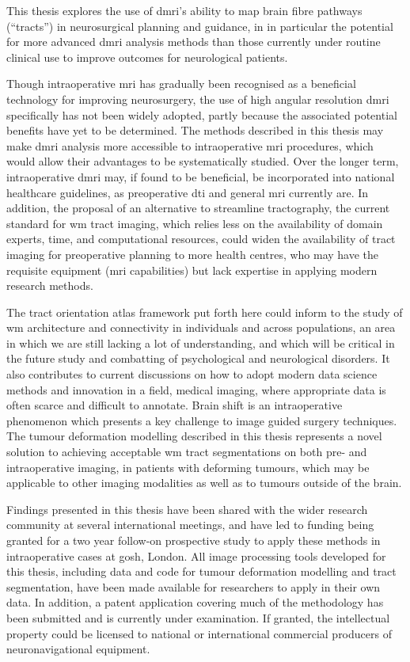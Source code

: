 \begin{impactstatement}

This thesis explores the use of \gls{dmri}'s ability to map brain fibre pathways (``tracts'') in neurosurgical planning and guidance, in in particular the potential for more advanced \gls{dmri} analysis methods than those currently under routine clinical use to improve outcomes for neurological patients.

Though intraoperative \gls{mri} has gradually been recognised as a beneficial technology for improving neurosurgery, the use of high angular resolution \gls{dmri} specifically has not been widely adopted, partly because the associated potential benefits have yet to be determined.
The methods described in this thesis may make \gls{dmri} analysis more accessible to intraoperative \gls{mri} procedures, which would allow their advantages to be systematically studied.
Over the longer term, intraoperative \gls{dmri} may, if found to be beneficial, be incorporated into national healthcare guidelines, as preoperative \gls{dti} and general \gls{mri} currently are.
In addition, the proposal of an alternative to streamline tractography, the current standard for \gls{wm} tract imaging, which relies less on the availability of domain experts, time, and computational resources, could widen the availability of tract imaging for preoperative planning to more health centres, who may have the requisite equipment (\gls{mri} capabilities) but lack expertise in applying modern research methods.

The tract orientation atlas framework put forth here could inform to the study of \gls{wm} architecture and connectivity in individuals and across populations, an area in which we are still lacking a lot of understanding, and which will be critical in the future study and combatting of psychological and neurological disorders.
It also contributes to current discussions on how to adopt modern data science methods and innovation in a field, medical imaging, where appropriate data is often scarce and difficult to annotate.
Brain shift is an intraoperative phenomenon which presents a key challenge to image guided surgery techniques.
The tumour deformation modelling described in this thesis represents a novel solution to achieving acceptable \gls{wm} tract segmentations on both pre- and intraoperative imaging, in patients with deforming tumours, which may be applicable to other imaging modalities as well as to tumours outside of the brain.

Findings presented in this thesis have been shared with the wider research community at several international meetings, and have led to funding being granted for a two year follow-on prospective study to apply these methods in intraoperative cases at \gls{gosh}, London.
All image processing tools developed for this thesis, including data and code for tumour deformation modelling and tract segmentation, have been made available for researchers to apply in their own data.
In addition, a patent application covering much of the methodology has been submitted and is currently under examination.
If granted, the intellectual property could be licensed to national or international commercial producers of neuronavigational equipment.


\end{impactstatement}

